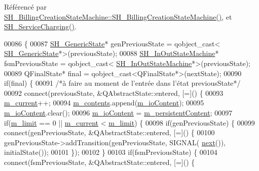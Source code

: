 Référencé par \hyperlink{classSH__BillingCreationStateMachine_ad62b77fa4aeafe200056ff3974562f83}{S\-H\-\_\-\-Billing\-Creation\-State\-Machine\-::\-S\-H\-\_\-\-Billing\-Creation\-State\-Machine()}, et \hyperlink{classSH__ServiceCharging_afa5273d046049b1c2b020a6a19a8290b}{S\-H\-\_\-\-Service\-Charging()}.


\begin{DoxyCode}
00086 \{
00087     \hyperlink{classSH__GenericState}{SH\_GenericState}* genPreviousState = qobject\_cast<
      \hyperlink{classSH__GenericState}{SH\_GenericState}*>(previousState);
00088     \hyperlink{classSH__InOutStateMachine}{SH\_InOutStateMachine}* fsmPreviousState = qobject\_cast<
      \hyperlink{classSH__InOutStateMachine}{SH\_InOutStateMachine}*>(previousState);
00089     QFinalState* \textcolor{keyword}{final} = qobject\_cast<QFinalState*>(nextState);
00090     \textcolor{keywordflow}{if}(\textcolor{keyword}{final}) \{
00091         \textcolor{comment}{/*à faire au moment de l'entrée dans l'état previousState*/}
00092         connect(previousState, &QAbstractState::entered, [=]() \{
00093             \hyperlink{classSH__LoopingInOutStateMachine_af64f9f28a1b8e82bd9ee5f4b96a7c82e}{m\_current}++;
00094             \hyperlink{classSH__LoopingInOutStateMachine_a145e625dcb4d5438bd9c761eeb9425d4}{m\_contents}.append(\hyperlink{classSH__InOutStateMachine_a8cfbc27eef057bf37b7711bdfef2077e}{m\_ioContent});
00095             \hyperlink{classSH__InOutStateMachine_a8cfbc27eef057bf37b7711bdfef2077e}{m\_ioContent}.clear();
00096             \hyperlink{classSH__InOutStateMachine_a8cfbc27eef057bf37b7711bdfef2077e}{m\_ioContent} = \hyperlink{classSH__LoopingInOutStateMachine_a4e9ea23cf1eecbe26c6ed93b290a9115}{m\_persistentContent};
00097             \textcolor{keywordflow}{if}(\hyperlink{classSH__LoopingInOutStateMachine_a818a60d3691fcac11323ad114c309dcb}{m\_limit} == 0 || \hyperlink{classSH__LoopingInOutStateMachine_af64f9f28a1b8e82bd9ee5f4b96a7c82e}{m\_current} < \hyperlink{classSH__LoopingInOutStateMachine_a818a60d3691fcac11323ad114c309dcb}{m\_limit}) \{
00098                 \textcolor{keywordflow}{if}(genPreviousState) \{
00099                     connect(genPreviousState, &QAbstractState::entered, [=]() \{
00100                         genPreviousState->addTransition(genPreviousState, SIGNAL(
      \hyperlink{classSH__GenericStateMachine_af4771d31d87951c997fba1633c2d67f6}{next}()), initialState());
00101                     \});
00102                 \}
00103                 \textcolor{keywordflow}{if}(fsmPreviousState) \{
00104                     connect(fsmPreviousState, &QAbstractState::entered, [=]() \{

\end{DoxyCode}
